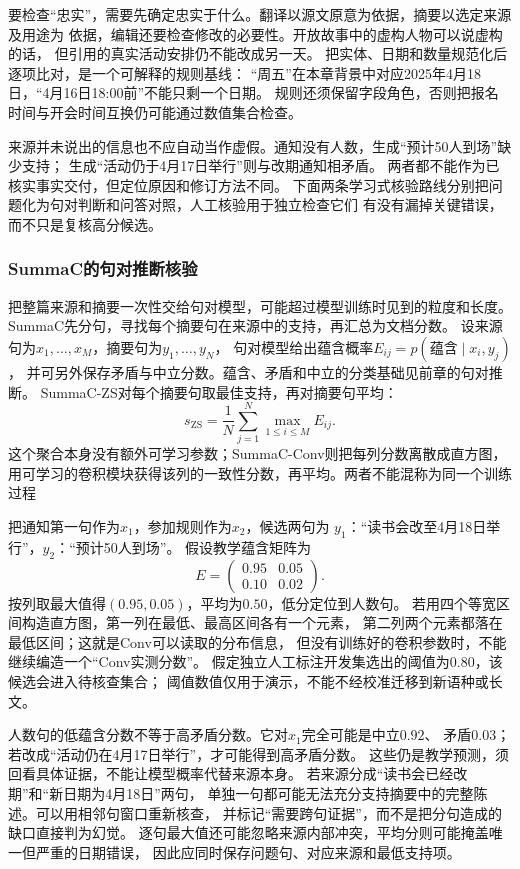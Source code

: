 要检查“忠实”，需要先确定忠实于什么。翻译以源文原意为依据，摘要以选定来源及用途为
依据，编辑还要检查修改的必要性。开放故事中的虚构人物可以说虚构的话，
但引用的真实活动安排仍不能改成另一天。
把实体、日期和数量规范化后逐项比对，是一个可解释的规则基线：
“周五”在本章背景中对应2025年4月18日，“4月16日18:00前”不能只剩一个日期。
规则还须保留字段角色，否则把报名时间与开会时间互换仍可能通过数值集合检查。

来源并未说出的信息也不应自动当作虚假。通知没有人数，生成“预计50人到场”缺少支持；
生成“活动仍于4月17日举行”则与改期通知相矛盾。
两者都不能作为已核实事实交付，但定位原因和修订方法不同。
下面两条学习式核验路线分别把问题化为句对判断和问答对照，人工核验用于独立检查它们
有没有漏掉关键错误，而不只是复核高分候选。

\subsubsection{SummaC的句对推断核验}
\label{sec:nlp-generation-summac}

把整篇来源和摘要一次性交给句对模型，可能超过模型训练时见到的粒度和长度。
SummaC先分句，寻找每个摘要句在来源中的支持，再汇总为文档分数。
设来源句为$x_1,\ldots,x_M$，摘要句为$y_1,\ldots,y_N$，
句对模型给出蕴含概率$E_{ij}=p(\text{蕴含}\mid x_i,y_j)$，
并可另外保存矛盾与中立分数。蕴含、矛盾和中立的分类基础见前章的句对推断。
SummaC-ZS对每个摘要句取最佳支持，再对摘要句平均：
\begin{equation}
  s_{\mathrm{ZS}}=\frac{1}{N}\sum_{j=1}^{N}\max_{1\leq i\leq M}E_{ij}.
  \label{eq:nlp-generation-summac}
\end{equation}
这个聚合本身没有额外可学习参数；SummaC-Conv则把每列分数离散成直方图，
用可学习的卷积模块获得该列的一致性分数，再平均。两者不能混称为同一个训练过程

把通知第一句作为$x_1$，参加规则作为$x_2$，候选两句为
$y_1$：“读书会改至4月18日举行”，$y_2$：“预计50人到场”。
假设教学蕴含矩阵为
\[
  E=\begin{pmatrix}0.95&0.05\\0.10&0.02\end{pmatrix}.
\]
按列取最大值得$(0.95,0.05)$，平均为$0.50$，低分定位到人数句。
若用四个等宽区间构造直方图，第一列在最低、最高区间各有一个元素，
第二列两个元素都落在最低区间；这就是Conv可以读取的分布信息，
但没有训练好的卷积参数时，不能继续编造一个“Conv实测分数”。
假定独立人工标注开发集选出的阈值为$0.80$，该候选会进入待核查集合；
阈值数值仅用于演示，不能不经校准迁移到新语种或长文。

人数句的低蕴含分数不等于高矛盾分数。它对$x_1$完全可能是中立$0.92$、
矛盾$0.03$；若改成“活动仍在4月17日举行”，才可能得到高矛盾分数。
这些仍是教学预测，须回看具体证据，不能让模型概率代替来源本身。
若来源分成“读书会已经改期”和“新日期为4月18日”两句，
单独一句都可能无法充分支持摘要中的完整陈述。可以用相邻句窗口重新核查，
并标记“需要跨句证据”，而不是把分句造成的缺口直接判为幻觉。
逐句最大值还可能忽略来源内部冲突，平均分则可能掩盖唯一但严重的日期错误，
因此应同时保存问题句、对应来源和最低支持项。

